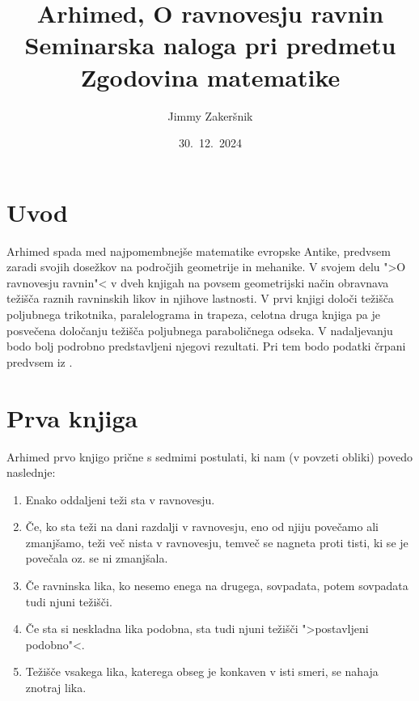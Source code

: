 \documentclass[a4paper, 10pt]{article}
\title{Arhimed, O ravnovesju ravnin\\ {\large Seminarska naloga pri predmetu Zgodovina matematike}}
\date{30.~12.~2024}
\author{Jimmy Zakeršnik}
\begin{document}
	\maketitle
	\thispagestyle{empty}
	\newpage
	\tableofcontents
	\newpage
	\section{Uvod}
		Arhimed spada med najpomembnejše matematike evropske Antike, predvsem zaradi svojih dosežkov na področjih geometrije in mehanike. V svojem delu ">O ravnovesju ravnin"< v dveh knjigah na povsem geometrijski način obravnava težišča raznih ravninskih likov in njihove lastnosti. V prvi knjigi določi težišča poljubnega trikotnika, paralelograma in trapeza, celotna druga knjiga pa je posvečena določanju težišča poljubnega paraboličnega odseka. V nadaljevanju bodo bolj podrobno predstavljeni njegovi rezultati. Pri tem bodo podatki črpani predvsem iz \cite{bib:Heath}.
	\section{Prva knjiga}
		Arhimed prvo knjigo prične s sedmimi postulati, ki nam (v povzeti obliki) povedo naslednje: \begin{enumerate}
			\item Enako oddaljeni teži sta v ravnovesju.
			\item Če, ko sta teži na dani razdalji v ravnovesju, eno od njiju povečamo ali zmanjšamo, teži več nista v ravnovesju, temveč se nagneta proti tisti, ki se je povečala oz. se ni zmanjšala.
			\item Če ravninska lika, ko nesemo enega na drugega, sovpadata, potem sovpadata tudi njuni težišči.
			\item Če sta si neskladna lika podobna, sta tudi njuni težišči ">postavljeni podobno"<. 
			\item Težišče vsakega lika, katerega obseg je konkaven v isti smeri, se nahaja znotraj lika.
		\end{enumerate}
		
\end{document}
